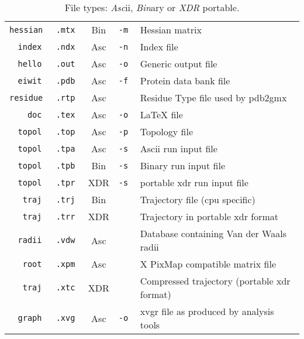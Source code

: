 \begin{table}[p]
\begin{tabularx}{\linewidth}{rlccX}
\tt hessian &\tt .mtx & Bin &\tt -m & Hessian matrix \\
\tt   index &\tt .ndx & Asc &\tt -n & Index file \\
\tt   hello &\tt .out & Asc &\tt -o & Generic output file \\
\tt   eiwit &\tt .pdb & Asc &\tt -f & Protein data bank file \\
\tt residue &\tt .rtp & Asc &\tt    & Residue Type file used by pdb2gmx \\
\tt     doc &\tt .tex & Asc &\tt -o & LaTeX file \\
\tt   topol &\tt .top & Asc &\tt -p & Topology file \\
\tt   topol &\tt .tpa & Asc &\tt -s & Ascii run input file \\
\tt   topol &\tt .tpb & Bin &\tt -s & Binary run input file \\
\tt   topol &\tt .tpr & XDR &\tt -s & portable xdr run input file \\
\tt    traj &\tt .trj & Bin &\tt    & Trajectory file (cpu specific) \\
\tt    traj &\tt .trr & XDR &\tt    & Trajectory in portable xdr format \\
\tt   radii &\tt .vdw & Asc &\tt    & Database containing Van der Waals radii \\
\tt    root &\tt .xpm & Asc &\tt    & X PixMap compatible matrix file \\
\tt    traj &\tt .xtc & XDR &\tt    & Compressed trajectory (portable xdr format)\\
\tt   graph &\tt .xvg & Asc &\tt -o & xvgr file as produced by analysis tools \\
\hline
\end{tabularx}
\caption{File types: {\em Asc\/}ii, {\em Bin\/}ary or {\em XDR\/} portable.}
\label{Tab:form}
\end{table}
